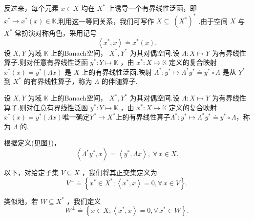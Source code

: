 反过来，每个元素 $x \in  X$ 均在 ${X}^{ * }$ 上诱导一个有界线性泛函，即 ${x}^{ * } \mapsto  {x}^{ * }\left( x\right)  \in  \mathbb{K}$.利用这一等同关系，我们可写作 $X \subseteq \; {\left( {X}^{ * }\right) }^{ * }$ .由于空间 $X$ 与 ${X}^{ * }$ 常扮演对称角色，采用记号
\[
\left\langle  {{x}^{ * },x}\right\rangle   \doteq  {x}^{ * }\left( x\right) .
\]
设 $X,Y$ 为域 $\mathbb{K}$ 上的Banach空间， ${X}^{ * },{Y}^{ * }$ 为其对偶空间.设 $\Lambda  : X \mapsto  Y$ 为有界线性算子.则对任意有界线性泛函 ${y}^{ * } : Y \mapsto  \mathbb{K}$ ，由 ${x}^{ * } : X \mapsto  \mathbb{K}$ 定义的复合映射 ${x}^{ * }\left( x\right)  = {y}^{ * }\left( {\Lambda x}\right)$ 是 $X$ 上的有界线性泛函.映射 $\Lambda^*:{y}^{ * } \mapsto  {\Lambda }^{ * }{y}^{ * } \doteq  {y}^{ * } \circ  \Lambda$ 是从 ${Y}^{ * }$ 到 ${X}^{ * }$ 的有界线性算子，称为 $\Lambda$ 的伴随算子.\par
\begin{definition}[伴随算子]
    设 $X,Y$ 为域 $\mathbb{K}$ 上的Banach空间， ${X}^{ * },{Y}^{ * }$ 为其对偶空间.设 $\Lambda  : X \mapsto  Y$ 为有界线性算子.则对任意有界线性泛函 ${y}^{ * } : Y \mapsto  \mathbb{K}$ ，由 ${x}^{ * } : X \mapsto  \mathbb{K}$ 定义的复合映射 ${x}^{ * }\left( x\right)  = {y}^{ * }\left( {\Lambda x}\right)$唯一确定$Y^*\to X^*$上的有界线性算子$\Lambda^*:{y}^{ * } \mapsto  {\Lambda }^{ * }{y}^{ * } \doteq  {y}^{ * } \circ  \Lambda$，称为 $\Lambda$ 的.
\end{definition}
根据定义(见图\ref{fig:adjoint-maps})，
\[
\left\langle  {{\Lambda }^{ * }{y}^{ * },x}\right\rangle   = \left\langle  {{y}^{ * },{\Lambda x}}\right\rangle,\;\forall\,x \in  X.
\]

以下，对给定子集 $V \subseteq  X$ ，我们将其正交集定义为
\[
{V}^{ \bot  } \doteq  \left\{  {{x}^{ * } \in  {X}^{ * };\left\langle  {{x}^{ * },x}\right\rangle   = 0,\forall\,x \in  V}\right\}  .
\]

类似地，若 $W \subseteq  {X}^{ * }$ ，我们定义
\[
{W}^{ \bot  } \doteq  \left\{  {x \in  X;\left\langle  {{x}^{ * },x}\right\rangle   = 0,\forall\,{x}^{ * } \in  W}\right\}  .
\]

\begin{figure}[htbp]
\centering
{}
\label{fig:adjoint-maps}
\end{figure}


